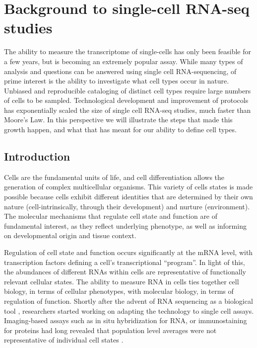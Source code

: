 
\chapter{Background to single-cell RNA-seq studies}  %

\graphicspath{{Chapter1/Figs/}}

The ability to measure the transcriptome of single-cells has only been feasible for a few
years, but is becoming an extremely popular assay. While many types of analysis and
questions can be answered using single cell RNA-sequencing, of prime interest is the ability
to investigate what cell types occur in nature. Unbiased and reproducible cataloging of
distinct cell types require large numbers of cells to be sampled. Technological development
and improvement of protocols has exponentially scaled the size of single cell RNA-seq
studies, much faster than Moore’s Law. In this perspective we will illustrate the steps that
made this growth happen, and what that has meant for our ability to define cell types.

\section{Introduction}

Cells are the fundamental units of life, and cell differentiation allows the generation of
complex multicellular organisms. This variety of cells states is made possible because cells
exhibit different identities that are determined by their own nature (cell-intrinsically, through
their development) and nurture (environment). The molecular mechanisms that regulate cell
state and function are of fundamental interest, as they reflect underlying phenotype, as well
as informing on developmental origin and tissue context.

Regulation of cell state and function occurs significantly at the mRNA level, with transcription
factors defining a cell’s transcriptional “program”. In light of this, the abundances of different
RNAs within cells are representative of functionally relevant cellular states. The ability to
measure RNA in cells ties together cell biology, in terms of cellular phenotypes, with
molecular biology, in terms of regulation of function.
Shortly after the advent of RNA sequencing as a biological tool \cite{Mortazavi2008-rq}, researchers started working on adapting the technology to single cell assays. Imaging-based assays such as in situ hybridization for RNA, or immunostaining for proteins had long revealed that population level averages were not representative of individual cell states \cite{Raj2008-wj}.


